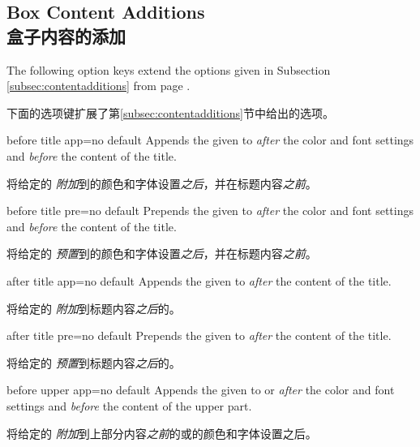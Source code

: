 
\subsection{Box Content Additions\\盒子内容的添加}\label{subsec:hookscontentadditions}
The following option keys extend the options given in Subsection \ref{subsec:contentadditions}
from page \pageref{subsec:contentadditions}.

下面的选项键扩展了第\ref{subsec:contentadditions}节中给出的选项。
\begin{docTcbKey}{before title app}{=}{no default}
Appends the given  to  \emph{after} the color and font settings
and \emph{before} the content of the title.

将给定的 \emph{附加}到的颜色和字体设置\emph{之后}，并在标题内容\emph{之前}。
\end{docTcbKey}

\begin{docTcbKey}{before title pre}{=}{no default}
Prepends the given  to  \emph{after} the color and font settings
and \emph{before} the content of the title.

将给定的 \emph{预置}到的颜色和字体设置\emph{之后}，并在标题内容\emph{之前}。
\end{docTcbKey}

\begin{docTcbKey}{after title app}{=}{no default}
Appends the given  to  \emph{after} the content of the title.

将给定的 \emph{附加}到标题内容\emph{之后}的。
\end{docTcbKey}

\begin{docTcbKey}{after title pre}{=}{no default}
Prepends the given  to  \emph{after} the content of the title.

将给定的 \emph{预置}到标题内容\emph{之后}的。
\end{docTcbKey}

\begin{docTcbKey}{before upper app}{=}{no default}
Appends the given  to  or  \emph{after} the color and font settings
and \emph{before} the content of the upper part.

将给定的 \emph{附加}到上部分内容\emph{之前}的或的颜色和字体设置之后。
\end{docTcbKey}

